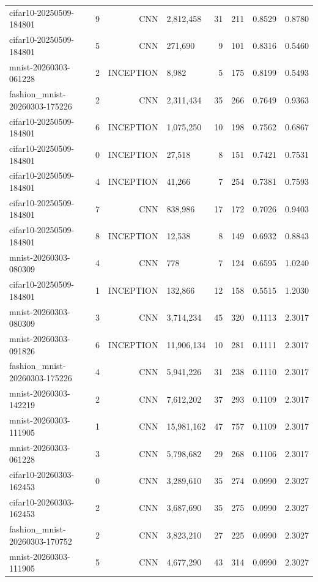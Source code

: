 \begin{tabular}{llrlrrrr}
cifar10-20250509-184801 & 9 & CNN & 2,812,458 & 31 & 211 & 0.8529 & 0.8780 \\
cifar10-20250509-184801 & 5 & CNN & 271,690 & 9 & 101 & 0.8316 & 0.5460 \\
mnist-20260303-061228 & 2 & INCEPTION & 8,982 & 5 & 175 & 0.8199 & 0.5493 \\
fashion_mnist-20260303-175226 & 2 & CNN & 2,311,434 & 35 & 266 & 0.7649 & 0.9363 \\
cifar10-20250509-184801 & 6 & INCEPTION & 1,075,250 & 10 & 198 & 0.7562 & 0.6867 \\
cifar10-20250509-184801 & 0 & INCEPTION & 27,518 & 8 & 151 & 0.7421 & 0.7531 \\
cifar10-20250509-184801 & 4 & INCEPTION & 41,266 & 7 & 254 & 0.7381 & 0.7593 \\
cifar10-20250509-184801 & 7 & CNN & 838,986 & 17 & 172 & 0.7026 & 0.9403 \\
cifar10-20250509-184801 & 8 & INCEPTION & 12,538 & 8 & 149 & 0.6932 & 0.8843 \\
mnist-20260303-080309 & 4 & CNN & 778 & 7 & 124 & 0.6595 & 1.0240 \\
cifar10-20250509-184801 & 1 & INCEPTION & 132,866 & 12 & 158 & 0.5515 & 1.2030 \\
mnist-20260303-080309 & 3 & CNN & 3,714,234 & 45 & 320 & 0.1113 & 2.3017 \\
mnist-20260303-091826 & 6 & INCEPTION & 11,906,134 & 10 & 281 & 0.1111 & 2.3017 \\
fashion_mnist-20260303-175226 & 4 & CNN & 5,941,226 & 31 & 238 & 0.1110 & 2.3017 \\
mnist-20260303-142219 & 2 & CNN & 7,612,202 & 37 & 293 & 0.1109 & 2.3017 \\
mnist-20260303-111905 & 1 & CNN & 15,981,162 & 47 & 757 & 0.1109 & 2.3017 \\
mnist-20260303-061228 & 3 & CNN & 5,798,682 & 29 & 268 & 0.1106 & 2.3017 \\
cifar10-20260303-162453 & 0 & CNN & 3,289,610 & 35 & 274 & 0.0990 & 2.3027 \\
cifar10-20260303-162453 & 2 & CNN & 3,687,690 & 35 & 275 & 0.0990 & 2.3027 \\
fashion_mnist-20260303-170752 & 2 & CNN & 3,823,210 & 27 & 225 & 0.0990 & 2.3027 \\
mnist-20260303-111905 & 5 & CNN & 4,677,290 & 43 & 314 & 0.0990 & 2.3027 \\
\bottomrule
\end{tabular}